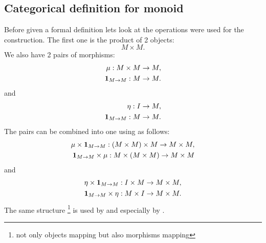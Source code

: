 \subsection{Categorical definition for monoid}
Before given a formal definition lets look at the operations were used
for the construction. The first one is the product of 2 objects:
\[
M \times M.
\]
We also have 2 pairs of morphisms:
\begin{eqnarray}
\mu: M \times M \to M,
\nonumber \\
\mathbf{1}_{ M \to M }: M \to M.
\nonumber
\end{eqnarray}
and
\begin{eqnarray}
\eta: I \to M, 
\nonumber \\
\mathbf{1}_{ M \to M }: M \to M.
\nonumber
\end{eqnarray}
The pairs can be combined into one using
 as follows:
\begin{eqnarray}
\mu \times \mathbf{1}_{ M \to M }: \left(M \times M\right) \times M \to M \times M,
\nonumber \\
\mathbf{1}_{ M \to M } \times \mu: M \times \left(M \times M\right) \to M \times M
\nonumber
\end{eqnarray}
and
\begin{eqnarray}
\eta \times \mathbf{1}_{ M \to M }: I \times M \to M \times M,
\nonumber \\
\mathbf{1}_{ M \to M } \times \eta: M \times I \to M \times M.
\nonumber
\end{eqnarray}
The same structure 
\footnote{not only objects mapping but also morphisms mapping}
is used by
and
especially by .  

